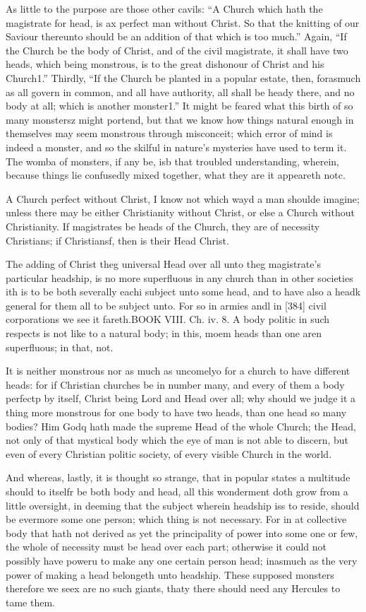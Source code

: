 As little to the purpose are those other cavils: “A Church which hath the magistrate for head, is ax perfect man without Christ. So that the knitting of our Saviour thereunto should be an addition of that which is too much.” Again, “If the Church be the body of Christ, and of the civil magistrate, it shall have two heads, which being monstrous, is to the great dishonour of Christ and his Church1.” Thirdly, “If the Church be planted in a popular estate, then, forasmuch as all govern in common, and all have authority, all shall be heady there, and no body at all; which is another monster1.” It might be feared what this birth of so many monstersz might portend, but that we know how things natural enough in themselves may seem monstrous through misconceit; which error of mind is indeed a monster, and so the skilful in nature’s mysteries have used to term it. The womba of monsters, if any be, isb that troubled understanding, wherein, because things lie confusedly mixed together, what they are it appeareth notc.

A Church perfect without Christ, I know not which wayd a man shoulde imagine; unless there may be either Christianity without Christ, or else a Church without Christianity. If magistrates be heads of the Church, they are of necessity Christians; if Christiansf, then is their Head Christ.

The adding of Christ theg universal Head over all unto theg magistrate’s particular headship, is no more superfluous in any church than in other societies ith is to be both severally eachi subject unto some head, and to have also a headk general for them all to be subject unto. For so in armies andl in [384] civil corporations we see it fareth.BOOK VIII. Ch. iv. 8. A body politic in such respects is not like to a natural body; in this, moem heads than one aren superfluous; in that, not.

It is neither monstrous nor as much as uncomelyo for a church to have different heads: for if Christian churches be in number many, and every of them a body perfectp by itself, Christ being Lord and Head over all; why should we judge it a thing more monstrous for one body to have two heads, than one head so many bodies? Him Godq hath made the supreme Head of the whole Church; the Head, not only of that mystical body which the eye of man is not able to discern, but even of every Christian politic society, of every visible Church in the world.

And whereas, lastly, it is thought so strange, that in popular states a multitude should to itselfr be both body and head, all this wonderment doth grow from a little oversight, in deeming that the subject wherein headship iss to reside, should be evermore some one person; which thing is not necessary. For in at collective body that hath not derived as yet the principality of power into some one or few, the whole of necessity must be head over each part; otherwise it could not possibly have poweru to make any one certain person head; inasmuch as the very power of making a head belongeth unto headship. These supposed monsters therefore we seex are no such giants, thaty there should need any Hercules to tame them.

